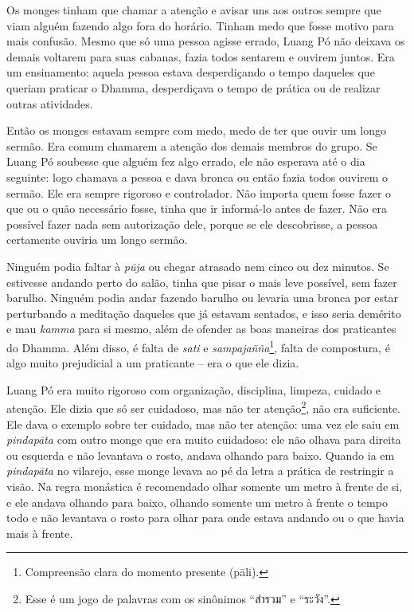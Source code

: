 Os monges tinham que chamar a atenção e avisar uns aos outros sempre que
viam alguém fazendo algo fora do horário. Tinham medo que fosse motivo
para mais confusão. Mesmo que só uma pessoa agisse errado, Luang Pó não
deixava os demais voltarem para suas cabanas, fazia todos sentarem e
ouvirem juntos. Era um ensinamento: aquela pessoa estava desperdiçando o
tempo daqueles que queriam praticar o Dhamma, desperdiçava o tempo de
prática ou de realizar outras atividades.

Então os monges estavam sempre com medo, medo de ter que ouvir um longo
sermão. Era comum chamarem a atenção dos demais membros do grupo. Se
Luang Pó soubesse que alguém fez algo errado, ele não esperava até o dia
seguinte: logo chamava a pessoa e dava bronca ou então fazia todos
ouvirem o sermão. Ele era sempre rigoroso e controlador. Não importa
quem fosse fazer o que ou o quão necessário fosse, tinha que ir
informá-lo antes de fazer. Não era possível fazer nada sem autorização
dele, porque se ele descobrisse, a pessoa certamente ouviria um longo
sermão.

Ninguém podia faltar à \emph{pūja} ou chegar atrasado nem cinco ou dez
minutos. Se estivesse andando perto do salão, tinha que pisar o mais
leve possível, sem fazer barulho. Ninguém podia andar fazendo barulho ou
levaria uma bronca por estar perturbando a meditação daqueles que já
estavam sentados, e isso seria demérito e mau \emph{kamma} para si
mesmo, além de ofender as boas maneiras dos praticantes do Dhamma. Além
disso, é falta de \emph{sati} e \emph{sampajañña}\footnote{Compreensão
  clara do momento presente (pāli).}, falta de compostura, é algo muito
prejudicial a um praticante -- era o que ele dizia.

Luang Pó era muito rigoroso com organização, disciplina, limpeza,
cuidado e atenção. Ele dizia que só ser cuidadoso, mas não ter
atenção\footnote{Esse é um jogo de palavras com os sinônimos ``สำรวม'' e
  ``ระวัง''.}, não era suficiente. Ele dava o exemplo sobre ter cuidado,
mas não ter atenção: uma vez ele saiu em \emph{pindapāta} com outro
monge que era muito cuidadoso: ele não olhava para direita ou esquerda e
não levantava o rosto, andava olhando para baixo. Quando ia em
\emph{pindapāta} no vilarejo, esse monge levava ao pé da letra a prática
de restringir a visão. Na regra monástica é recomendado olhar somente um
metro à frente de si, e ele andava olhando para baixo, olhando somente
um metro à frente o tempo todo e não levantava o rosto para olhar para
onde estava andando ou o que havia mais à frente.

